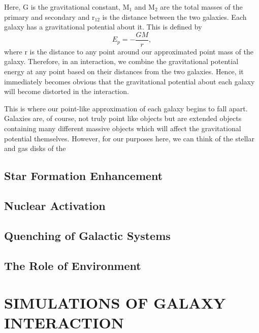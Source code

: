 Here, G is the gravitational constant, M$_{1}$ and M$_{2}$ are the total masses of the primary and secondary and r$_{12}$ is the distance between the two galaxies. Each galaxy has a gravitational potential about it. This is defined by
\begin{equation}
	E_{p} = -\frac{GM}{r},
\end{equation}
where r is the distance to any point around our approximated point mass of the galaxy. Therefore, in an interaction, we combine the gravitational potential energy at any point based on their distances from the two galaxies.  Hence, it immediately becomes obvious that the gravitational potential about each galaxy will become distorted in the interaction.

This is where our point-like approximation of each galaxy begins to fall apart. Galaxies are, of course, not truly point like objects but are extended objects containing many different massive objects which will affect the gravitational potential themselves. However, for our purposes here, we can think of the stellar and gas disks of the 



\subsection{Star Formation Enhancement} 
\subsection{Nuclear Activation}
\subsection{Quenching of Galactic Systems}
\subsection{The Role of Environment}

\section{SIMULATIONS OF GALAXY INTERACTION}

